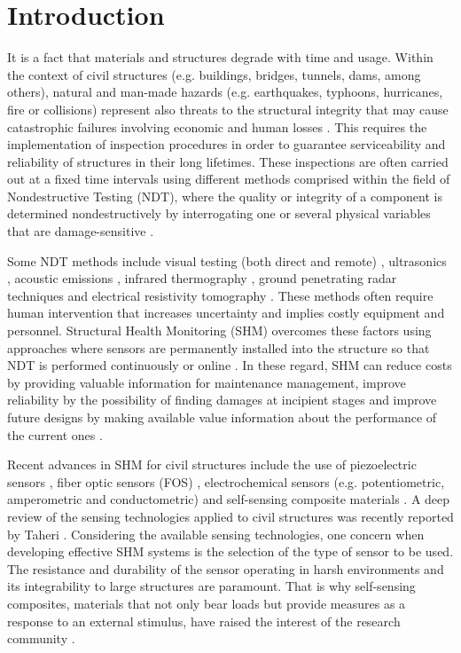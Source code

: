 \documentclass[twocolumn]{bmcart}%
\begin{document}
\section{Introduction}
It is a fact that materials and structures degrade with time and usage. Within the context of civil structures (e.g. buildings, bridges, tunnels, dams, among others), natural and man-made hazards (e.g. earthquakes, typhoons, hurricanes, fire or collisions) represent also threats to the structural integrity that may cause catastrophic failures involving economic and human losses \cite{Xu2017a}. This requires the implementation of inspection procedures in order to guarantee serviceability and reliability of structures in their long lifetimes. These inspections are often carried out at a fixed time intervals using different methods comprised within the field of Nondestructive Testing (NDT), where the quality or integrity of a component is determined nondestructively by interrogating one or several physical variables that are damage-sensitive \cite{Shull2002}.

Some NDT methods include visual testing (both direct and remote) \cite{Agnisarman2019}, ultrasonics \cite{Zhao2018}, acoustic emissions \cite{Meo2014}, infrared thermography \cite{Yamazaki2018}, ground penetrating radar techniques and electrical resistivity tomography \cite{Salin2018}. These methods often require human intervention that increases uncertainty and implies costly equipment and personnel. Structural Health Monitoring (SHM) overcomes these factors using approaches where sensors are permanently installed into the structure so that NDT is performed continuously or online \cite{Xu2017a}. In these regard, SHM can reduce costs by providing valuable information for maintenance management, improve reliability by the possibility of finding damages at incipient stages and improve future designs by making available value information about the performance of the current ones \cite{Ogai2018a}.

Recent advances in SHM for civil structures include the use of piezoelectric sensors \cite{Liao2019},  fiber optic sensors (FOS) \cite{Glisic2013, Barrias2019, Xu2019}, electrochemical sensors (e.g. potentiometric, amperometric and conductometric) \cite{Hu2011, Qiao2012} and self-sensing composite materials \cite{Tian2019a}. A deep review of the sensing technologies applied to civil structures was recently reported by Taheri \cite{Taheri2019a}. Considering the available sensing technologies, one concern when developing effective SHM systems is the selection of the type of sensor to be used. The resistance and durability of the sensor operating in harsh environments and its integrability to large structures are paramount. That is why self-sensing composites, materials that not only bear loads but provide measures as a response to an external stimulus, have raised the interest of the research community \cite{DAlessandro2016, Han2015a, Rana2016a, Yang2020a}.
\end{document}
